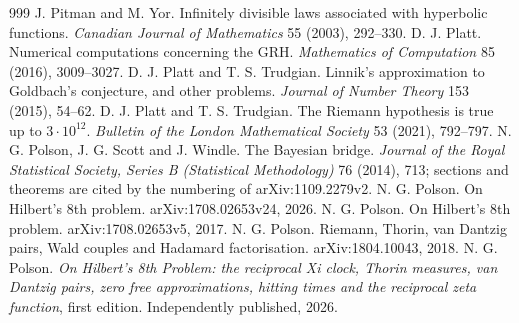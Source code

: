 \begin{thebibliography}{999}
 J. Pitman and M. Yor. Infinitely divisible laws associated with hyperbolic functions. \emph{Canadian Journal of Mathematics} 55 (2003), 292--330.
 D. J. Platt. Numerical computations concerning the GRH. \emph{Mathematics of Computation} 85 (2016), 3009--3027.
 D. J. Platt and T. S. Trudgian. Linnik's approximation to Goldbach's conjecture, and other problems. \emph{Journal of Number Theory} 153 (2015), 54--62.
 D. J. Platt and T. S. Trudgian. The Riemann hypothesis is true up to $3\cdot10^{12}$. \emph{Bulletin of the London Mathematical Society} 53 (2021), 792--797.
 N. G. Polson, J. G. Scott and J. Windle. The Bayesian bridge. \emph{Journal of the Royal Statistical Society, Series B (Statistical Methodology)} 76 (2014), 713; sections and theorems are cited by the numbering of arXiv:1109.2279v2.
 N. G. Polson. On Hilbert's 8th problem. arXiv:1708.02653v24, 2026.
 N. G. Polson. On Hilbert's 8th problem. arXiv:1708.02653v5, 2017.
 N. G. Polson. Riemann, Thorin, van Dantzig pairs, Wald couples and Hadamard factorisation. arXiv:1804.10043, 2018.
 N. G. Polson. \emph{On Hilbert's 8th Problem: the reciprocal Xi clock, Thorin measures, van Dantzig pairs, zero free approximations, hitting times and the reciprocal zeta function}, first edition. Independently published, 2026.

\end{thebibliography}
